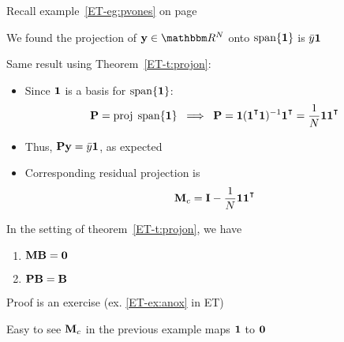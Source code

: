\begin{frame}
    
    \vspace{2em}
    \Eg
    Recall example~\ref{ET-eg:pvones} on page~\pageref{ET-eg:pvones}
    
    We found the projection of $\boldy \in \RR^N$ onto $\operatorname{span}\{{\mathbf 1}\}$ is
    $\bar y {\mathbf 1}$
    
    Same result using Theorem~\eqref{ET-t:projon}:
    \begin{itemize}
        \item Since ${\mathbf 1}$ is a basis for $\operatorname{span}\{{\mathbf 1}\}$:
            \begin{equation*}
                \label{eq:pcz}
                \boldP = \proj \; \Span\{\boldone\} 
                \; \implies \;
                \boldP 
                = \boldone (\boldone^\T\boldone)^{-1} \boldone^\T  
                = \frac{1}{N} \boldone \boldone^\T  
            \end{equation*}
        \item Thus, $\mathbf P {\mathbf y} = \bar y {\mathbf 1}$, as expected
        \item Corresponding residual projection is
        \begin{equation*}
            \label{eq:pczm}
            \boldM_c
            = \boldI - \frac{1}{N} \boldone \boldone^\T  
        \end{equation*}
    \end{itemize}

\end{frame}

\begin{frame}

     \vspace{2em}
    \Fact{\eqref{ET-fa:anox}} 
    In the setting of theorem~\ref{ET-t:projon}, we have 
    \begin{enumerate}
        \item $\mathbf M \mathbf B = {\mathbf 0}$
        \item $\mathbf P \mathbf B = \mathbf B$
    \end{enumerate}
    
    Proof is an exercise (ex. \ref{ET-ex:anox} in ET)
    
    \vspace{1em}
    Easy to see $\mathbf M_c$ in the previous example maps
    ${\mathbf 1}$ to ${\mathbf 0}$
    
\end{frame}

